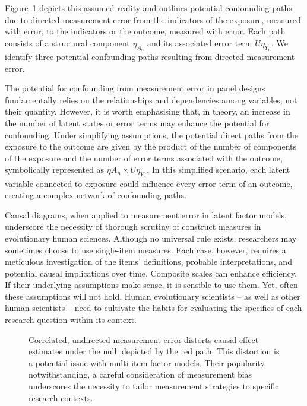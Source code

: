 \documentclass[
  singlecolumn,
  9pt]{article}
\begin{document}
Figure~\ref{fig-dag-coarsen-measurement-error} depicts this assumed
reality and outlines potential confounding paths due to directed
measurement error from the indicators of the exposure, measured with
error, to the indicators or the outcome, measured with error. Each path
consists of a structural component \(\eta_{A_n}\) and its associated
error term \(U\eta_{Y_n}\). We identify three potential confounding
paths resulting from directed measurement error.

The potential for confounding from measurement error in panel designs
fundamentally relies on the relationships and dependencies among
variables, not their quantity. However, it is worth emphasising that, in
theory, an increase in the number of latent states or error terms may
enhance the potential for confounding. Under simplifying assumptions,
the potential direct paths from the exposure to the outcome are given by
the product of the number of components of the exposure and the number
of error terms associated with the outcome, symbolically represented as
\(\eta A_n \times U\eta_{Y_n}\). In this simplified scenario, each
latent variable connected to exposure could influence every error term
of an outcome, creating a complex network of confounding paths.

Causal diagrams, when applied to measurement error in latent factor
models, underscore the necessity of thorough scrutiny of construct
measures in evolutionary human sciences. Although no universal rule
exists, researchers may sometimes choose to use single-item measures.
Each case, however, requires a meticulous investigation of the items'
definitions, probable interpretations, and potential causal implications
over time. Composite scales can enhance efficiency. If their underlying
assumptions make sense, it is sensible to use them. Yet, often these
assumptions will not hold. Human evolutionary scientists -- as well as
other human scientists -- need to cultivate the habits for evaluating
the specifics of each research question within its context.

\begin{figure}


\caption{\label{fig-dag-coarsen-measurement-error}Correlated, undirected
measurement error distorts causal effect estimates under the null,
depicted by the red path. This distortion is a potential issue with
multi-item factor models. Their popularity notwithstanding, a careful
consideration of measurement bias underscores the necessity to tailor
measurement strategies to specific research contexts.}

\end{figure}%
\end{document}
